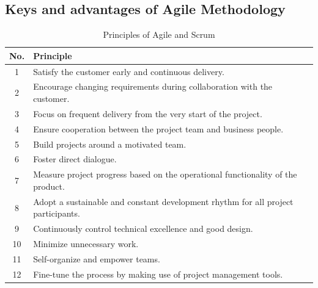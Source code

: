 \subsection{Keys and advantages of Agile Methodology}
\begin{table}[h]
\centering
\begin{tabular}{|c|l|}
\hline
\textbf{No.} & \textbf{Principle} \\ \hline
1  & Satisfy the customer early and continuous delivery. \\ \hline
2  & Encourage changing requirements during collaboration with the customer. \\ \hline
3  & Focus on frequent delivery from the very start of the project. \\ \hline
4  & Ensure cooperation between the project team and business people. \\ \hline
5  & Build projects around a motivated team. \\ \hline
6  & Foster direct dialogue. \\ \hline
7  & Measure project progress based on the operational functionality of the product. \\ \hline
8  & Adopt a sustainable and constant development rhythm for all project participants. \\ \hline
9  & Continuously control technical excellence and good design. \\ \hline
10 & Minimize unnecessary work. \\ \hline
11 & Self-organize and empower teams. \\ \hline
12 & Fine-tune the process by making use of project management tools. \\ \hline
\end{tabular}
\caption{Principles of Agile and Scrum}
\end{table}

